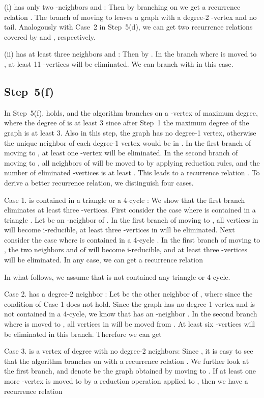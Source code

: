\documentclass{elsart_TR2}
\begin{document}
(i)  has only two -neighbors  and :
Then by branching on 
we get a recurrence relation .
The branch of moving  to  leaves a graph with a degree-2 -vertex  and no tail.
Analogously with Case~2 in Step~5(d),
we can get two recurrence relations covered by  and , respectively.

(ii)  has at least three neighbors  and :
Then  by .
In the branch where  is moved to , at least 11 -vertices will be eliminated.
We can branch with  in this case.

\subsection{Step~5(f)}
In Step~5(f),  holds, and
the algorithm branches on a -vertex  of maximum degree,
where the degree of  is  at least 3 since after Step~1 the maximum degree of the graph is at least 3.
Also in this step, the graph has no degree-1 vertex, otherwise the unique neighbor of each degree-1 vertex would be in .
In the first  branch of moving  to , at least one -vertex will be eliminated.
In the second branch of moving  to , all neighbors of  will be moved to  by applying reduction rules, and
the number of eliminated -vertices is at least  .
This leads to a recurrence relation .
To derive a better recurrence relation, we distinguish four cases.

Case 1.  is contained in a triangle  or a 4-cycle :
We show that the first  branch eliminates at least three -vertices.
First consider the case where  is contained in a triangle .
Let  be an -neighbor of .
In the first branch of moving  to ,
 all vertices in  will become i-reducible,
at least three -vertices in  will be eliminated.
Next consider the case where   is contained in a 4-cycle .
In the first branch of moving  to , the two neighbors  and  of  will become i-reducible,
and at least three -vertices will be eliminated.
In any case, we can get a recurrence relation


In what follows, we assume that  is not contained any triangle or 4-cycle.

Case 2.  has a degree-2 neighbor :
Let  be the other neighbor of , where 
 since the condition of Case 1 does not hold.
Since the graph has no degree-1 vertex and  is not contained in a 4-cycle,
we know that  has an -neighbor .
In the second branch where  is moved to ,
all vertices in  will be moved from .
At least six -vertices will be eliminated in this branch. Therefore we can get


Case 3.  is a vertex of degree  with no degree-2 neighbors:
Since , it is easy to see that the algorithm  branches on  with a recurrence relation
 .
We further look at the first branch, and denote  be the graph obtained by moving  to .
If at least one more -vertex is moved to  by a reduction operation applied to , then
we have a recurrence relation
\end{document}

